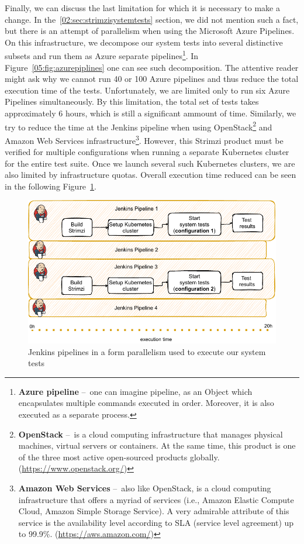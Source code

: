Finally, we can discuss the last limitation for which it is necessary to make a change.
In the~\ref{02:sec:strimzisystemtests} section, we did not mention such a fact, but there is an attempt of parallelism when using the Microsoft Azure Pipelines.
On this infrastructure, we decompose our system tests into several distinctive subsets and run them as Azure separate pipelines\footnote{\textbf{Azure pipeline} \---\ one can imagine pipeline, as an Object which encapsulates multiple commands executed in order. Moreover, it is also executed as a separate process.}.
In Figure~\ref{05:fig:azurepiplines} one can see such decomposition.
The attentive reader might ask why we cannot run 40 or 100 Azure pipelines and thus reduce the total execution time of the tests.
Unfortunately, we are limited only to run six Azure Pipelines simultaneously.
By this limitation, the total set of tests takes approximately 6 hours, which is still a significant ammount of time.
Similarly, we try to reduce the time at the Jenkins pipeline when using OpenStack\footnote{\textbf{OpenStack} \---\ is a cloud computing infrastructure that manages physical machines, virtual servers or containers. At the same time, this product is one of the three most active open-sourced products globally. (\url{https://www.openstack.org/})} and Amazon Web Services infrastructure\footnote{\textbf{Amazon Web Services} \---\ also like OpenStack, is a cloud computing infrastructure that offers a myriad of services (i.e., Amazon Elastic Compute Cloud, Amazon Simple Storage Service). A very admirable attribute of this service is the availability level according to SLA (service level agreement) up to 99.9\%. (\url{https://aws.amazon.com/})}.
However, this Strimzi product must be verified for multiple configurations when running a separate Kubernetes cluster for the entire test suite.
Once we launch several such Kubernetes clusters, we are also limited by infrastructure quotas.
Overall execution time reduced can be seen in the following Figure~\ref{05:fig:jenkinspipelines}.
\begin{figure}[!ht]
    \centering
    \includegraphics[scale=1]{obrazky-figures/06-proposal-of-parallel-approach/02-jenkins-smaller}
    \caption{Jenkins pipelines in a form parallelism used to execute our system tests}
    \label{05:fig:jenkinspipelines}
\end{figure}

